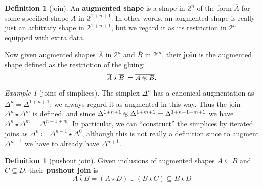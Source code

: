 \documentclass[12pt]{amsart}
\theoremstyle{plain}
\theoremstyle{definition}
\newtheorem{defn}[thm]{Definition}
\theoremstyle{remark}
\newtheorem{ex}[thm]{Example}
\numberwithin{equation}{section}
\newcommand{\defeq}{\coloneqq}
\newcommand{\restr}[1]{\overline{#1}}
\newcommand{\two}{\mathbb{2}}
\newcommand{\join}{\star}
\newcommand{\pojoin}{\mathbin{\widehat{\join}}}
\begin{document}
\begin{defn}[join]
  An \textbf{augmented shape} is a shape in $\two^n$ of the form $\restr{A}$ for some specified shape $A$ in $\two^{1+n+1}$.
  In other words, an augmented shape is really just an arbitrary shape in $\two^{1+n+1}$, but we regard it as its restriction in $\two^n$ equipped with extra data.

  Now given augmented shapes $\restr{A}$ in $\two^n$ and $\restr{B}$ in $\two^m$, their \textbf{join} is the augmented shape defined as the restriction of the gluing:
  \[ \restr{A} \join \restr{B} \defeq \restr{A \oast B}.\]
\end{defn}

\begin{ex}[joins of simplices]
  The simplex $\Delta^n$ has a canonical augmentation as $\Delta^n = \restr{\Delta^{1+n+1}}$; we always regard it as augmented in this way.
  Thus the join $\Delta^n \join \Delta^m$ is defined, and since $\Delta^{1+n+1} \oast \Delta^{1+m+1} = \Delta^{1+n+1+m+1}$ we have $\Delta^n \join \Delta^m = \Delta^{n+1+m}$.
  In particular, we can ``construct'' the simplices by iterated joins as $\Delta^n \defeq \Delta^{n-1} \star \Delta^0$, although this is not really a definition since to augment $\Delta^{n-1}$ we have to already have $\Delta^{n+1}$.
\end{ex}

\begin{defn}[pushout join]
  Given inclusions of augmented shapes $A\subseteq B$ and $C\subseteq D$, their \textbf{pushout join} is
  \[ A \pojoin B = (A \join D) \cup (B\join C) \subseteq B\join D \]
\end{defn}
\end{document}
